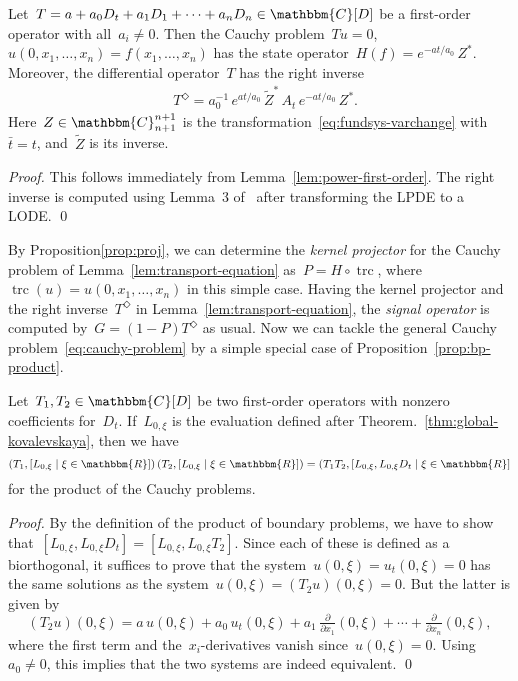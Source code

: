 \documentclass[a4paper]{llncs}
\let\mathbb\mathbbm
\newcommand{\RR}{\mathbb{R}}
\newcommand{\CC}{\mathbb{C}}
\newcommand{\mat}[3]{#1^{#2}_{#3}}
\newcommand{\der}{D}
\newcommand{\fri}[1]{#1^\Diamond}
\newcommand{\trc}{\operatorname{trc}}
\newenvironment{myproof}{\begin{proof}}{\qed\end{proof}}
\begin{document}
\begin{mylemma}
  \label{lem:transport-equation}
  Let~$T = a + a_0 \der_t + a_1 \der_1 + \cdots + a_n \der_n \in \CC[D]$ be a
  first-order operator with all~$a_i \ne 0$. Then the Cauchy problem~$Tu=0$,
  $u(0, x_1, \dots, x_n) = f(x_1, \dots, x_n)$ has the state operator~$H(f) =
  e^{-at/a_0} \, Z^*$. Moreover, the differential operator~$T$ has the right
  inverse
\begin{align*}
    &\fri{T} = a_0^{-1} \, e^{at/a_0} \, \tilde{Z}^* \, A_t \, e^{-at/a_0} \, Z^*.
  \end{align*}
Here~$Z \in \mat{\CC}{n+1}{n+1}$ is the
  transformation~\eqref{eq:fundsys-varchange} with~$\bar{t} = t$,
  and~$\tilde{Z}$ is its inverse.
\end{mylemma}
\begin{myproof}
  This follows immediately from Lemma~\ref{lem:power-first-order}. The right
  inverse is computed using Lemma~3 of~\cite{Rosenkranz2005} after transforming
  the LPDE to a LODE.
\end{myproof}

By Proposition\ref{prop:proj}, we can determine the \emph{kernel projector} for
the Cauchy problem of Lemma~\ref{lem:transport-equation} as~$P = H \circ \trc$,
where~$\trc(u) = u(0, x_1, \dots, x_n)$ in this simple case. Having the kernel
projector and the right inverse~$\fri{T}$ in Lemma~\ref{lem:transport-equation},
the \emph{signal operator} is computed by~$G = (1-P) \fri{T}$ as usual. Now we
can tackle the general Cauchy problem~\eqref{eq:cauchy-problem} by a simple
special case of Proposition~\ref{prop:bp-product}.

\begin{myproposition}
  \label{prop:ivp-product}
  Let~$T_1, T_2 \in \CC[D]$ be two first-order operators with nonzero
  coefficients for~$\der_t$. If~$L_{0,\xi}$ is the evaluation defined after
  Theorem.~\ref{thm:global-kovalevskaya}, then we have
\begin{equation*}
    (T_1, [L_{0, \xi} \mid \xi \in \RR]) \, (T_2, [L_{0, \xi} \mid \xi \in \RR]) 
    = (T_1 T_2, [L_{0, \xi}, L_{0, \xi} D_t \mid \xi \in \RR]
  \end{equation*}
for the product of the Cauchy problems.
\end{myproposition}
\begin{myproof}
  By the definition of the product of boundary problems, we have to show
  that~$[L_{0, \xi}, L_{0, \xi} D_t] = [L_{0, \xi}, L_{0, \xi} T_2]$. Since each
  of these is defined as a biortho\-gonal, it suffices to prove that the
  system~$u(0,\xi) = u_t(0,\xi) = 0$ has the same solutions as the
  system~$u(0,\xi) = (T_2 u)(0,\xi) = 0$. But the latter is given by
\begin{equation*}
    (T_2 u)(0,\xi) = a \, u(0,\xi) + a_0 \, u_t(0, \xi) + a_1 \,
    \tfrac{\partial}{\partial x_1}(0, \xi) + \cdots +
    \tfrac{\partial}{\partial x_n}(0, \xi),
  \end{equation*}
where the first term and the~$x_i$-derivatives vanish since~$u(0,\xi) =
  0$. Using~$a_0 \ne 0$, this implies that the two systems are indeed
  equivalent.
\end{myproof}
\end{document}
